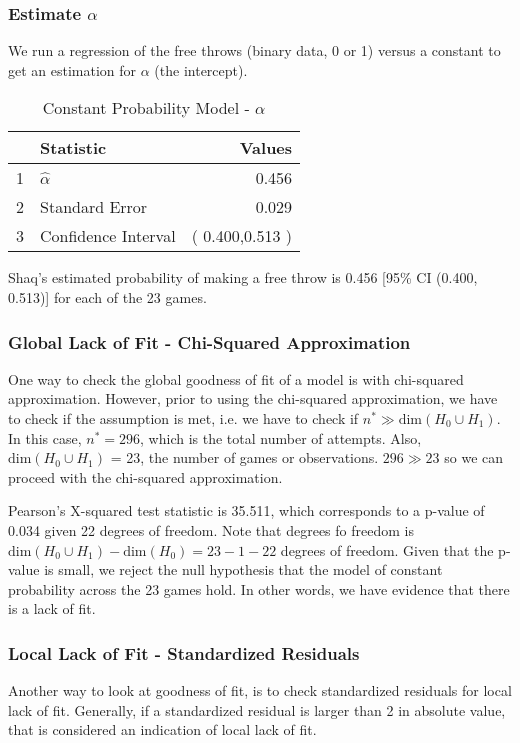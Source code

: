 \documentclass[12pt, letterpaper]{article}
\begin{document}
\subsubsection{Estimate $\alpha$} 
We run a regression of the free throws (binary data, 0 or 1) versus a constant to get an estimation for $\alpha$ (the intercept).  
\begin{table}[ht]
	\centering
	\caption{Constant Probability Model -  $\alpha$} 
	\begin{tabular}{clr}
		\hline
		& Statistic & Values \\ 
		\hline
		1 & $\hat{\alpha}$ & 0.456 \\ 
		2 & Standard Error & 0.029 \\ 
		3 & Confidence Interval & ( 0.400,0.513 ) \\ 
		\hline
	\end{tabular}
\end{table}

Shaq's estimated probability of making a free throw is 0.456 [95\% CI (0.400, 0.513)] for each of the 23 games.  

\subsubsection{Global Lack of Fit - Chi-Squared Approximation} 
One way to check the global goodness of fit of a model is with chi-squared approximation.  However, prior to using the chi-squared approximation, we have to check if the assumption is met, i.e. we have to check if $n^* \gg \text{dim}(H_0 \cup H_1)$.  In this case, $n^* = 296$, which is the total number of attempts.  Also, $\text{dim}(H_0 \cup H_1)$ = 23, the number of games or observations.  $296 \gg 23$ so we can proceed with the chi-squared approximation.  

Pearson's X-squared test statistic is 35.511, which corresponds to a p-value of 0.034 given 22 degrees of freedom. Note that degrees fo freedom is $\text{dim}(H_0 \cup H_1)  - \text{dim}(H_0) = 23-1- 22$ degrees of freedom. Given that the p-value is small, we reject the null hypothesis that the model of constant probability across the 23 games hold.  In other words, we have evidence that there is a lack of fit.   

\subsubsection{Local Lack of Fit - Standardized Residuals} 
Another way to look at goodness of fit, is to check standardized residuals for local lack of fit.  Generally, if a standardized residual is larger than 2 in absolute value, that is considered an indication of local lack of fit.  
\end{document}
